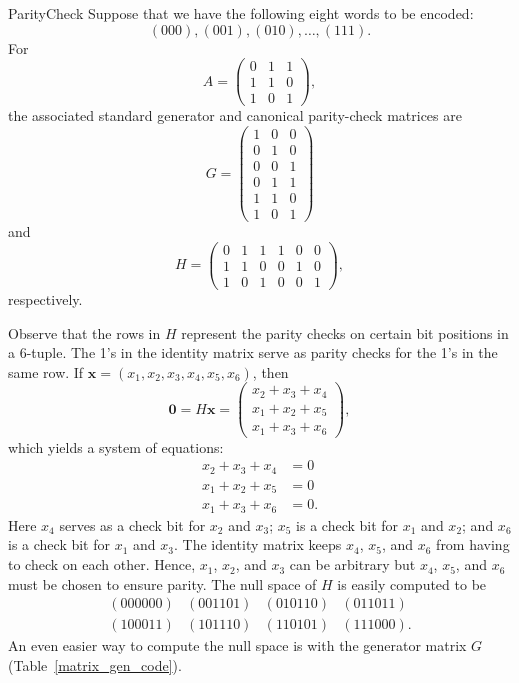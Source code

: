  
\begin{example}{ParityCheck}
Suppose that we have the following eight words to be
encoded:
\[
(000), (001), (010), \ldots, (111).
\] 
For
\[
A =
\begin{pmatrix}
0 & 1 & 1 \\
1 & 1 & 0 \\
1 & 0 & 1
\end{pmatrix},
\]
the associated standard generator and canonical parity-check matrices
are 
\[
G=
\begin{pmatrix}
1 & 0 & 0 \\
0 & 1 & 0 \\
0 & 0 & 1 \\
0 & 1 & 1 \\
1 & 1 & 0 \\
1 & 0 & 1
\end{pmatrix}
\]
and
\[
H =
\begin{pmatrix}
0 & 1 & 1 & 1 & 0 & 0 \\
1 & 1 & 0 & 0 & 1 & 0 \\
1 & 0 & 1 & 0 & 0 & 1
\end{pmatrix},
\]
respectively.
 
 
Observe that the rows in $H$  represent the parity checks on certain
bit positions in a 6-tuple. The 1's in the identity matrix serve as
parity checks for the 1's in the same row. If ${\mathbf x} = (x_1, x_2,
x_3, x_4, x_5, x_6)$, then 
\[
{\mathbf 0}
=
H{\mathbf x}
=
\begin{pmatrix}
x_2 + x_3 + x_4 \\
x_1 + x_2 + x_5\\
x_1 + x_3 + x_6
\end{pmatrix},
\]
which yields a system of equations:
\begin{align*}
x_2 + x_3 + x_4 & = 0 \\
x_1 + x_2 + x_5 & = 0 \\
x_1 + x_3 + x_6 & = 0.
\end{align*}
Here $x_4$ serves as a check bit for $x_2$ and $x_3$; $x_5$ is a check
bit for $x_1$ and $x_2$; and $x_6$ is a check bit for $x_1$ and $x_3$.
The identity matrix keeps $x_4$, $x_5$, and $x_6$ from having to check
on each other. Hence, $x_1$, $x_2$, and $x_3$ can be arbitrary but
$x_4$, $x_5$, and $x_6$ must be chosen to ensure parity. The null
space of $H$ is easily computed to be
\[
\begin{array}{cccc}
 (000000) & (001101) & (010110) & (011011) \\
 (100011) & (101110) & (110101) & (111000).
\end{array}
\]
An even easier way to compute the null space is with the generator
matrix $G$ (Table~\ref{matrix_gen_code}). 
\end{example}
 
